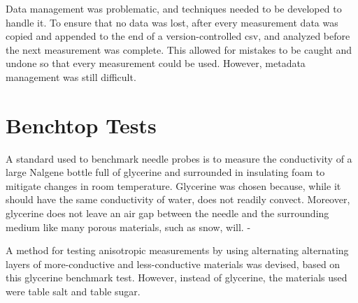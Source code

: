 Data management was problematic, and techniques needed to be developed to handle
it. To ensure that no data was lost, after every measurement data was copied and
appended to the end of a version-controlled csv, and analyzed before the next
measurement was complete. This allowed for mistakes to be caught and undone so
that every measurement could be used. However, metadata management was still
difficult.

\section{Benchtop Tests}

A standard used to benchmark needle probes is to measure the conductivity of a
large Nalgene bottle full of glycerine and surrounded in insulating foam to
mitigate changes in room temperature. Glycerine was chosen because, while it
should have the same conductivity of water, does not readily convect. Moreover,
glycerine does not leave an air gap between the needle and the surrounding
medium like many porous materials, such as snow, will. -

A method for testing anisotropic measurements by using alternating alternating
layers of more-conductive and less-conductive materials was devised, based on
this glycerine benchmark test. However, instead of glycerine, the materials
used were table salt and table sugar.

